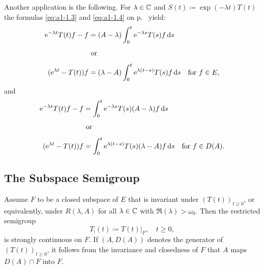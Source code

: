 Another application is the following.
For $\lambda \in \mathbb{C}$ and $S(t) \coloneq \exp(-\lambda t)T(t)$ the formulas \eqref{eq:a1-1.3} and \eqref{eq:a1-1.4} on p.~\pageref{eq:a1-1.4} yield:
\begin{equation}\label{eq:a1-3.1}
\begin{split}
     \mathrm{e}^{-\lambda t}T(t)f - f &= (A-\lambda) \int_{0}^{t}  \mathrm{e}^{-\lambda s}T(s)f \mathop{}\!\mathrm{d}{s} \\[4pt]
     & \text{ or } \\[4pt]
    ( \mathrm{e}^{\lambda t}-T(t))f &= (\lambda-A) \int_{0}^{t}  \mathrm{e}^{\lambda(t-s)}T(s)f \mathop{}\!\mathrm{d}{s} \quad \text{for } f \in E,  
\end{split}
\end{equation}
and
\begin{equation}\label{eq:a1-3.2}
\begin{split}
     \mathrm{e}^{-\lambda t}T(t)f - f &= \int_{0}^{t}  \mathrm{e}^{-\lambda s}T(s)(A-\lambda)f \mathop{}\!\mathrm{d}{s} \\[4pt]
     & \text{ or } \\[4pt]
    ( \mathrm{e}^{\lambda t} - T(t))f &= \int_{0}^{t}  \mathrm{e}^{\lambda(t-s)}T(s)(\lambda-A)f \mathop{}\!\mathrm{d}{s} \quad \text{for } f \in D(A).  
\end{split}
\end{equation}
\subsection{The Subspace Semigroup}\label{subsec:a1-3.3}%

Assume $F$ to be a closed subspace of $E$ that is invariant under $(T(t))_{t \geq 0}$, or equivalently, under $R(\lambda, A)$ for all $\lambda \in \mathbb{C}$ with $\Re(\lambda) > \omega_{0}$.
Then the restricted semigroup
\[
    T_{\vert}(t) \coloneq T(t)\big|_{F}, \quad t \geq 0,
\]
is strongly continuous on $F$.
If $(A, D(A))$ denotes the generator of $(T(t))_{t \geq 0}$, it follows from the invariance and closedness of $F$ that $A$ maps $D(A) \cap F$ into $F$.

